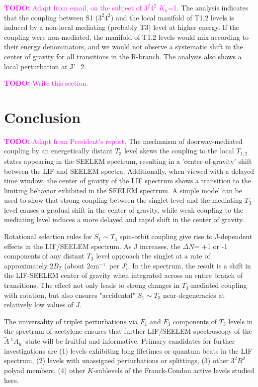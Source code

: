 \documentclass[12pt,draft]{mitthesis}
\newcommand{\TODO} [1]{\textcolor{magenta}{\textbf{TODO:} #1}}
\newcommand{\POINT}[1]{\textcolor{magenta}{\textbf{POINT:} #1}}
\newcommand{\rcm}{cm$^{-1}$}
\newcommand{\astate}{$
  \tilde{A} \: ^1\!A_u
  $}
\begin{document}
\TODO{Adapt from email, on the subject of $3^2 4^2$ $K_a$=1.}  The
analysis indicates that the coupling between S1 ($3^2 4^2$) and the
local manifold of T1,2 levels is induced by a non-local mediating
(probably T3) level at higher energy.  If the coupling were
non-mediated, the manifold of T1,2 levels would mix according to their
energy denominators, and we would not observe a systematic shift in
the center of gravity for all transitions in the R-branch.  The
analysis also shows a local perturbation at J'=2.

\TODO{Write this section.}

\section{Conclusion}

\TODO{Adapt from President's report.}  The mechanism of
doorway-mediated coupling by an energetically distant $T_3$ level
skews the coupling to the local $T_{1,2}$ states appearing in the
SEELEM spectrum, resulting in a 'center-of-gravity' shift between the
LIF and SEELEM spectra.  Additionally, when viewed with a delayed time
window, the center of gravity of the LIF spectrum shows a transition
to the limiting behavior exhibited in the SEELEM spectrum.  A simple
model can be used to show that strong coupling between the singlet
level and the mediating $T_3$ level causes a gradual shift in the
center of gravity, while weak coupling to the mediating level induces
a more delayed and rapid shift in the center of gravity.

Rotational selection rules for $S_1 \sim T_3$ spin-orbit coupling give
rise to J-dependent effects in the LIF/SEELEM spectrum.  As J
increases, the $\Delta N$= +1 or -1 components of any distant $T_3$
level approach the singlet at a rate of approximately $2B_T$ (about
2\rcm\ per $J$).  In the spectrum, the result is a shift in the
LIF-SEELEM center of gravity when integrated across an entire branch
of transitions.  The effect not only leads to strong changes in
$T_3$-mediated coupling with rotation, but also ensures "accidental"
$S_1 \sim T_3$ near-degeneracies at relatively low values of $J$.


The universality of triplet perturbations via $F_1$ and $F_3$
components of $T_3$ levels in the spectrum of acetylene ensures that
further LIF/SEELEM spectroscopy of the \astate\ state will be fruitful
and informative.  Primary candidates for further investigations are
(1) levels exhibiting long lifetimes or quantum beats in the LIF
spectrum, (2) levels with unassigned perturbations or splittings, (3)
other $3^2B^2$ polyad members, (4) other $K$-sublevels of the
Franck-Condon active levels studied here.



\end{document}
